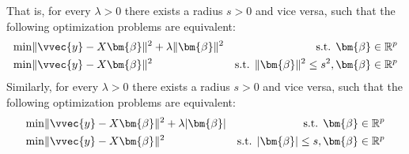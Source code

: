 \documentclass[letterpaper,10pt,english]{jupyterBook}
\begin{document}
\sphinxAtStartPar
That is, for every \(\lambda>0\) there exists a radius \(s>0\) and vice versa, such that the following optimization problems are equivalent:
\label{equation:regression_L1vsL2:c0a29c1e-54e3-4c6b-818e-e41ddc17562e}\begin{align}
        \min &\lVert \vvec{y}-X\bm{\beta}\rVert^2 + \lambda \lVert\bm{\beta}\rVert^2 & \text{s.t. }\bm{\beta}\in\mathbb{R}^p  \\
        \min &\lVert \vvec{y}-X\bm{\beta}\rVert^2 & \text{s.t. } \lVert\bm{\beta}\rVert^2\leq s^2,\bm{\beta}\in\mathbb{R}^p  \\
\end{align}
\sphinxAtStartPar
Similarly, for every \(\lambda>0\) there exists a radius \(s>0\) and vice versa, such that the following optimization problems are equivalent:
\label{equation:regression_L1vsL2:1ee325b4-e9dd-4caf-8d2a-1d6e437c7fbf}\begin{align}
        \min &\lVert \vvec{y}-X\bm{\beta}\rVert^2 + \lambda \lvert\bm{\beta}\rvert & \text{s.t. }\bm{\beta}\in\mathbb{R}^p  \\
        \min &\lVert \vvec{y}-X\bm{\beta}\rVert^2 & \text{s.t. } \lvert\bm{\beta}\rvert\leq s,\bm{\beta}\in\mathbb{R}^p  \\
\end{align}
\end{document}
